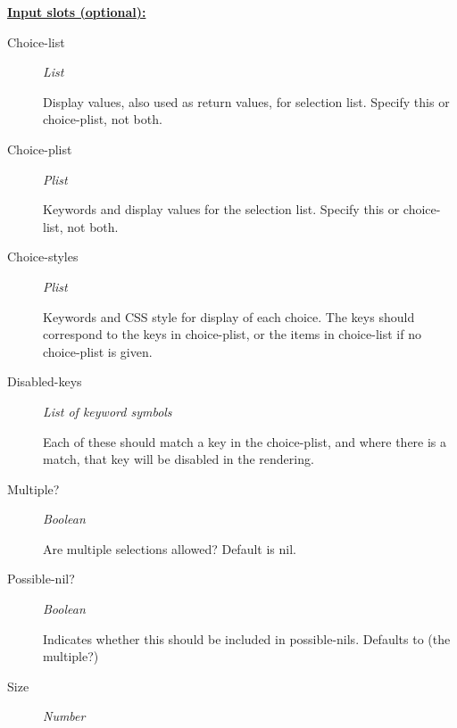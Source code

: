 \documentclass [11pt]{book}
\begin{document}
\begin{itemize}
\begin{figure}
\label{fig:example-code-gwl:menu-form-control}

\end{figure}





\textbf{
\underline{Input slots (optional):}}

\begin{description}

\item [Choice-list]
\emph{List}

 Display values, also used as return values, for selection list. Specify this or choice-plist, not both.




\item [Choice-plist]
\emph{Plist}

 Keywords and display values for the selection list. Specify this or choice-list, not both.




\item [Choice-styles]
\emph{Plist}

 Keywords and CSS style for display of each choice. The keys should correspond to the
keys in choice-plist, or the items in choice-list if no choice-plist is given.




\item [Disabled-keys]
\emph{List of keyword symbols}

 Each of these should match a key in the choice-plist, and where there is a
match, that key will be disabled in the rendering.




\item [Multiple?]
\emph{Boolean}

 Are multiple selections allowed? Default is nil.




\item [Possible-nil?]
\emph{Boolean}

 Indicates whether this should be included in possible-nils. Defaults to (the multiple?)




\item [Size]
\emph{Number}


\end{description}
\end{itemize}
\end{document}
